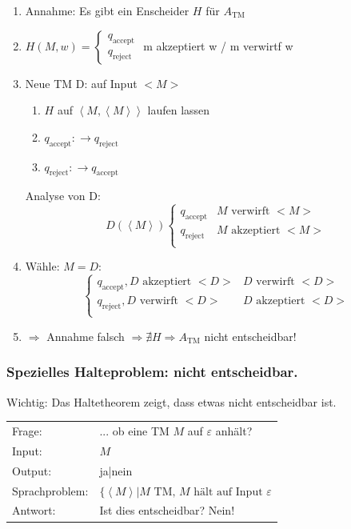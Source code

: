 \begin{enumerate}
	\item	Annahme: Es gibt ein Enscheider $H$ für $A_\text{TM}$
	\item	$H(M,w) = \begin{cases}
			q_\text{accept}\\
			q_\text{reject}
		\end{cases}$
		m akzeptiert w / m verwirtf w \\
	\item	Neue TM D: auf Input $<M>$ \begin{enumerate}
			\item $H$ auf $\left<M,\left<M\right>\right>$ laufen lassen
			\item $q_\text{accept} : \rightarrow q_\text{reject}$
			\item $q_\text{reject} : \rightarrow q_\text{accept}$
		\end{enumerate}
		Analyse von D: \[
			D(\left<M\right>) \begin{cases}
			q_\text{accept} & M \text{ verwirft } <M>\\
			q_\text{reject} & M \text{ akzeptiert } <M>\\
			\end{cases}
		\]
	\item Wähle: $M=D$: \[
			\begin{cases}
			q_\text{accept}, D \text{ akzeptiert } <D> & D \text{ verwirft } <D>\\
			q_\text{reject}, D \text{ verwirft } <D> & D \text{ akzeptiert } <D>\\
			\end{cases}
		\]
	\item	$\Rightarrow$ Annahme falsch $\Rightarrow \nexists H \Rightarrow A_\text{TM}$ nicht entscheidbar!
\end{enumerate}


\subsubsection{Spezielles Halteproblem: nicht entscheidbar.}

Wichtig: Das Haltetheorem zeigt, dass etwas nicht entscheidbar ist.

\begin{tabu}{l X}
	Frage: &... ob eine TM $M$ auf $\varepsilon$ anhält?\\
	Input: & $M$\\
	Output: & ja|nein\\
	Sprachproblem: &$ \{\left<M\right>|M \text{ TM, } M \text{ hält auf Input } \varepsilon$\\
	Antwort: &Ist dies entscheidbar? Nein!
\end{tabu}

